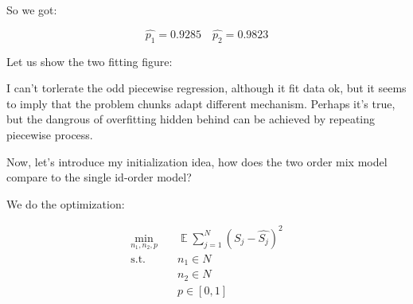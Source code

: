 \documentclass{article}
\DeclareMathOperator{\E}{\mathbb{E}}
\begin{document}
So we got:
 
\[
\hat{p_1} = 0.9285 \quad \hat{p_2} = 0.9823
\]

Let us show the two fitting figure:

\begin{figure}[h]

\centering

 
\end{figure}

I can't torlerate the odd piecewise regression, although it fit data ok, but it seems to imply that the problem chunks
adapt different mechanism. Perhaps it's true, but the dangrous of overfitting hidden behind can be achieved by 
repeating piecewise process.

Now, let's introduce my initialization idea, how does the two order mix model compare to the single id-order model?

We do the optimization:


\begin{align*}
\min_{n_1,n_2,p} & \quad \E\sum_{j=1}^N (S_j - \hat{S_j})^2 \\
\textrm{s.t.}    & \quad n_1 \in N \\
                 & \quad n_2 \in N \\
                 & \quad p \in [0,1]
\end{align*}
\end{document}

